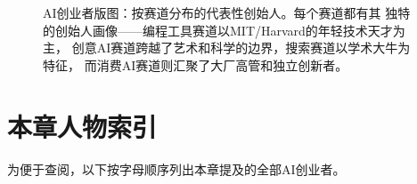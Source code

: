 \begin{figure}[htbp]
\caption{AI创业者版图：按赛道分布的代表性创始人。每个赛道都有其
独特的创始人画像——编程工具赛道以MIT/Harvard的年轻技术天才为主，
创意AI赛道跨越了艺术和科学的边界，搜索赛道以学术大牛为特征，
而消费AI赛道则汇聚了大厂高管和独立创新者。}
\label{fig:founders-landscape}
\end{figure}


\section{本章人物索引}
\label{sec:founders-index}

为便于查阅，以下按字母顺序列出本章提及的全部AI创业者。

